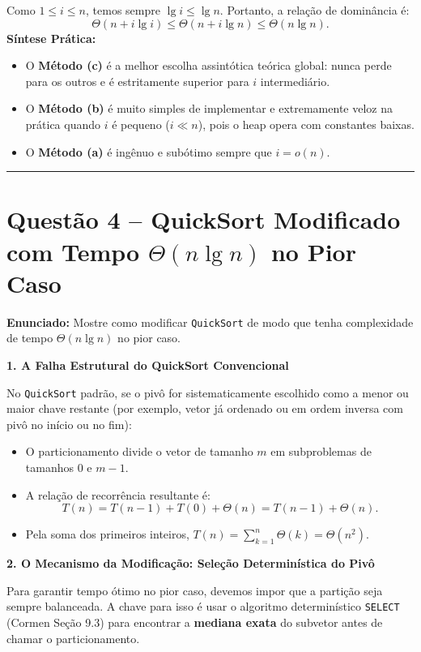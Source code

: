 \documentclass[11pt,a4paper]{article}
\newcommand{\topico}[1]{\par\medskip\textbf{\color{azul}#1}\par}
\newcommand{\questao}[2]{\section*{Questão #1 -- #2}}
\newcommand{\destaque}[1]{\textbf{\color{azul}#1}}
\begin{document}
\begin{caixaEstudo}
Como $1 \le i \le n$, temos sempre $\lg i \le \lg n$. Portanto, a relação de dominância é:
\[
\boxed{\Theta(n + i \lg i) \le \Theta(n + i \lg n) \le \Theta(n \lg n).}
\]
\textbf{Síntese Prática:}
\begin{itemize}
    \item O \textbf{Método (c)} é a melhor escolha assintótica teórica global: nunca perde para os outros e é estritamente superior para $i$ intermediário.
    \item O \textbf{Método (b)} é muito simples de implementar e extremamente veloz na prática quando $i$ é pequeno ($i \ll n$), pois o heap opera com constantes baixas.
    \item O \textbf{Método (a)} é ingênuo e subótimo sempre que $i = o(n)$.
\end{itemize}
\end{caixaEstudo}

\vspace{10pt}
\hrule
\vspace{6pt}

\questao{4}{QuickSort Modificado com Tempo $\Theta(n \lg n)$ no Pior Caso}

\textbf{Enunciado:} Mostre como modificar \texttt{QuickSort} de modo que tenha complexidade de tempo $\Theta(n \lg n)$ no pior caso.

\topico{1. A Falha Estrutural do QuickSort Convencional}
No \texttt{QuickSort} padrão, se o pivô for sistematicamente escolhido como a menor ou maior chave restante (por exemplo, vetor já ordenado ou em ordem inversa com pivô no início ou no fim):
\begin{itemize}
    \item O particionamento divide o vetor de tamanho $m$ em subproblemas de tamanhos $0$ e $m - 1$.
    \item A relação de recorrência resultante é:
    \[
    T(n) = T(n-1) + T(0) + \Theta(n) = T(n-1) + \Theta(n).
    \]
    \item Pela soma dos primeiros inteiros, $T(n) = \sum_{k=1}^n \Theta(k) = \Theta(n^2)$.
\end{itemize}

\topico{2. O Mecanismo da Modificação: Seleção Determinística do Pivô}
Para garantir tempo ótimo no pior caso, devemos impor que a partição seja sempre balanceada. A chave para isso é usar o algoritmo determinístico \texttt{SELECT} (Cormen Seção 9.3) para encontrar a \destaque{mediana exata} do subvetor antes de chamar o particionamento.
\end{document}
